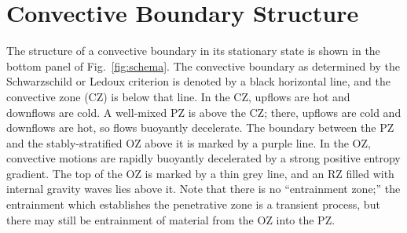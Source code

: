 \section{Convective Boundary Structure}
\label{sec:structure}
The structure of a convective boundary in its stationary state is shown in the bottom panel of Fig.~\ref{fig:schema}.
The convective boundary as determined by the Schwarzschild or Ledoux criterion is denoted by a black horizontal line, and the convective zone (CZ) is below that line.
In the CZ, upflows are hot and downflows are cold.
A well-mixed PZ is above the CZ; there, upflows are cold and downflows are hot, so flows buoyantly decelerate.
The boundary between the PZ and the stably-stratified OZ above it is marked by a purple line.
In the OZ, convective motions are rapidly buoyantly decelerated by a strong positive entropy gradient.
The top of the OZ is marked by a thin grey line, and an RZ filled with internal gravity waves lies above it.
Note that there is no ``entrainment zone;'' the entrainment which establishes the penetrative zone is a transient process, but there may still be entrainment of material from the OZ into the PZ.

